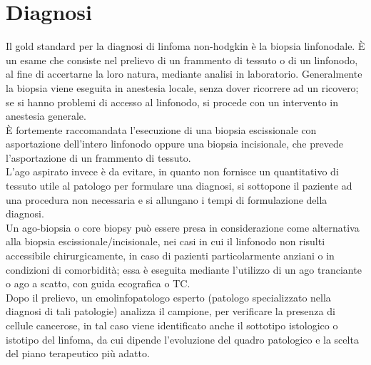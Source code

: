 \section{Diagnosi}
Il gold standard per la diagnosi di linfoma non-hodgkin è la biopsia linfonodale. 
È un esame che consiste nel prelievo di un frammento di tessuto o di un linfonodo, al fine di 
accertarne la loro natura, mediante analisi in laboratorio. 
Generalmente la biopsia viene eseguita in anestesia locale, senza dover ricorrere ad un ricovero; 
se si hanno problemi di accesso al linfonodo, si procede con un intervento in anestesia generale\cite{ISS}.\\
È fortemente raccomandata l’esecuzione di una biopsia escissionale con asportazione dell’intero linfonodo 
oppure una biopsia incisionale, che prevede l’asportazione di un frammento di tessuto\cite{AMERICANCANCER}.\\ 
L’ago aspirato invece è da evitare, in quanto non fornisce un quantitativo di tessuto utile al patologo per formulare 
una diagnosi, si sottopone il paziente ad una procedura non necessaria e si allungano i tempi di formulazione 
della diagnosi\cite{reteveneta}.\\
Un ago-biopsia o core biopsy può essere presa in considerazione come alternativa alla biopsia escissionale/incisionale,
nei casi in cui il linfonodo non risulti accessibile chirurgicamente, in caso di pazienti particolarmente anziani o in 
condizioni di comorbidità; essa è eseguita mediante l’utilizzo di un ago tranciante o ago a scatto, con guida 
ecografica o TC\cite{reteveneta}.\\
Dopo il prelievo, un emolinfopatologo esperto (patologo specializzato nella diagnosi di tali patologie) analizza 
il campione, per verificare la presenza di cellule cancerose, in tal caso viene identificato anche il sottotipo 
istologico o istotipo del linfoma, da cui dipende l’evoluzione del quadro patologico e la scelta del piano 
terapeutico più adatto\cite{LLS}.\\


